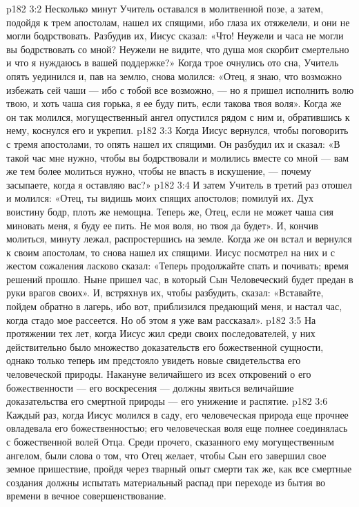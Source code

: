 \vs p182 3:2 Несколько минут Учитель оставался в молитвенной позе, а затем, подойдя к трем апостолам, нашел их спящими, ибо глаза их отяжелели, и они не могли бодрствовать. Разбудив их, Иисус сказал: «Что! Неужели и часа не могли вы бодрствовать со мной? Неужели не видите, что душа моя скорбит смертельно и что я нуждаюсь в вашей поддержке?» Когда трое очнулись ото сна, Учитель опять уединился и, пав на землю, снова молился: «Отец, я знаю, что возможно избежать сей чаши --- ибо с тобой все возможно, --- но я пришел исполнить волю твою, и хоть чаша сия горька, я ее буду пить, если такова твоя воля». Когда же он так молился, могущественный ангел опустился рядом с ним и, обратившись к нему, коснулся его и укрепил.
\vs p182 3:3 Когда Иисус вернулся, чтобы поговорить с тремя апостолами, то опять нашел их спящими. Он разбудил их и сказал: «В такой час мне нужно, чтобы вы бодрствовали и молились вместе со мной --- вам же тем более молиться нужно, чтобы не впасть в искушение, --- почему засыпаете, когда я оставляю вас?»
\vs p182 3:4 И затем Учитель в третий раз отошел и молился: «Отец, ты видишь моих спящих апостолов; помилуй их. Дух воистину бодр, плоть же немощна. Теперь же, Отец, если не может чаша сия миновать меня, я буду ее пить. Не моя воля, но твоя да будет». И, кончив молиться, минуту лежал, распростершись на земле. Когда же он встал и вернулся к своим апостолам, то снова нашел их спящими. Иисус посмотрел на них и с жестом сожаления ласково сказал: «Теперь продолжайте спать и почивать; время решений прошло. Ныне пришел час, в который Сын Человеческий будет предан в руки врагов своих». И, встряхнув их, чтобы разбудить, сказал: «Вставайте, пойдем обратно в лагерь, ибо вот, приблизился предающий меня, и настал час, когда стадо мое рассеется. Но об этом я уже вам рассказал».
\vs p182 3:5 \pc На протяжении тех лет, когда Иисус жил среди своих последователей, у них действительно было множество доказательств его божественной сущности, однако только теперь им предстояло увидеть новые свидетельства его человеческой природы. Накануне величайшего из всех откровений о его божественности --- его воскресения --- должны явиться величайшие доказательства его смертной природы --- его унижение и распятие.
\vs p182 3:6 Каждый раз, когда Иисус молился в саду, его человеческая природа еще прочнее овладевала его божественностью; его человеческая воля еще полнее соединялась с божественной волей Отца. Среди прочего, сказанного ему могущественным ангелом, были слова о том, что Отец желает, чтобы Сын его завершил свое земное пришествие, пройдя через тварный опыт смерти так же, как все смертные создания должны испытать материальный распад при переходе из бытия во времени в вечное совершенствование.
